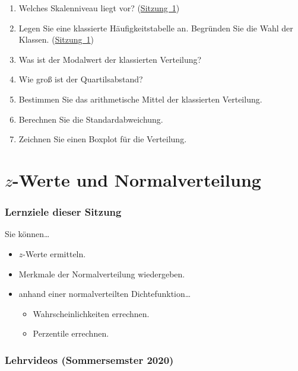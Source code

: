 \documentclass[
  11pt,
  ngerman,
  a4paper,
]{report}
\providecommand{\tightlist}{%
  \setlength{\itemsep}{0pt}\setlength{\parskip}{0pt}}
\begin{document}
\begin{enumerate}
\def\labelenumi{\alph{enumi})}
\tightlist
\item
  Welches Skalenniveau liegt vor? (\protect\hyperlink{skalenniveaus}{Sitzung~1})
\item
  Legen Sie eine klassierte Häufigkeitstabelle an. Begründen Sie die Wahl der Klassen. (\protect\hyperlink{quantitative-variablen-1}{Sitzung~1})
\item
  Was ist der Modalwert der klassierten Verteilung?
\item
  Wie groß ist der Quartilsabstand?
\item
  Bestimmen Sie das arithmetische Mittel der klassierten Verteilung.
\item
  Berechnen Sie die Standardabweichung.
\item
  Zeichnen Sie einen Boxplot für die Verteilung.
\end{enumerate}

\hypertarget{z-werte-und-normalverteilung}{%
\chapter{\texorpdfstring{\(z\)-Werte und Normalverteilung}{z-Werte und Normalverteilung}}\label{z-werte-und-normalverteilung}}

\hypertarget{lernziele-dieser-sitzung-2}{%
\subsection*{Lernziele dieser Sitzung}\label{lernziele-dieser-sitzung-2}}

Sie können\ldots{}

\begin{itemize}
\tightlist
\item
  \(z\)-Werte ermitteln.
\item
  Merkmale der Normalverteilung wiedergeben.
\item
  anhand einer normalverteilten Dichtefunktion\ldots{}

  \begin{itemize}
  \tightlist
  \item
    Wahrscheinlichkeiten errechnen.
  \item
    Perzentile errechnen.
  \end{itemize}
\end{itemize}

\hypertarget{lehrvideos-sommersemster-2020}{%
\subsection*{Lehrvideos (Sommersemster 2020)}\label{lehrvideos-sommersemster-2020}}
\end{document}
